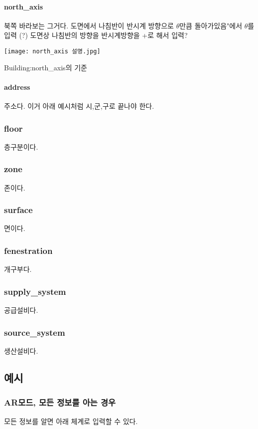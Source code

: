 \paragraph{north\_axis} 북쪽 바라보는 그거다. 도면에서 나침반이 반시계 방향으로 $\theta$만큼 돌아가있음"에서 $\theta$를 입력 (?) 도면상 나침반의 방향을 반시계방향을 +로 해서 입력? 
\begin{defaultfigure}
  \centering
  \texttt{[image: north\_axis 설명.jpg]}     %
  \caption{Building:north\_axis의 기준}
  \label{fig:example}
\end{defaultfigure}

\paragraph{address} 주소다. 이거 아래 예시처럼 시,군,구로 끝나야 한다.

\subsubsection{floor}
층구분이다.
\subsubsection{zone}
존이다.
\subsubsection{surface}
면이다.
\subsubsection{fenestration}
개구부다.
\subsubsection{supply\_system}
공급설비다.
\subsubsection{source\_system}
생산설비다.

\subsection{예시}
\subsubsection{AR모드, 모든 정보를 아는 경우}

모든 정보를 알면 아래 체계로 입력할 수 있다.

